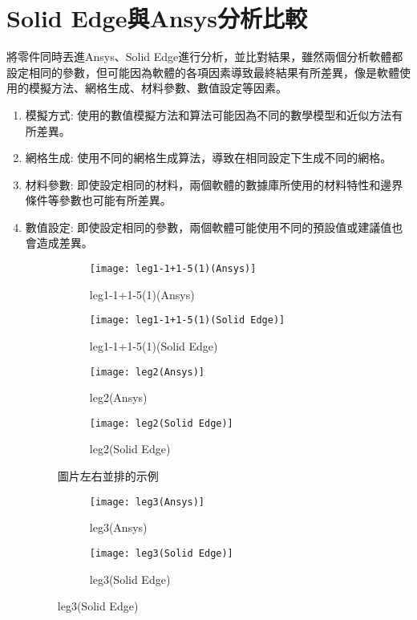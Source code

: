 \section{Solid Edge與Ansys分析比較}
將零件同時丟進Ansys、Solid Edge進行分析，並比對結果，雖然兩個分析軟體都設定相同的參數，但可能因為軟體的各項因素導致最終結果有所差異，像是軟體使用的模擬方法、網格生成、材料參數、數值設定等因素。\
\begin{enumerate}
\item 模擬方式: 使用的數值模擬方法和算法可能因為不同的數學模型和近似方法有所差異。
\item 網格生成: 使用不同的網格生成算法，導致在相同設定下生成不同的網格。
\item 材料參數: 即使設定相同的材料，兩個軟體的數據庫所使用的材料特性和邊界條件等參數也可能有所差異。
\item	數值設定: 即使設定相同的參數，兩個軟體可能使用不同的預設值或建議值也會造成差異。
\newpage
\begin{figure}[htbp]
  \centering
  \begin{subfigure}[t]{0.48\textwidth}
    \centering
    \texttt{[image: leg1-1+1-5(1)(Ansys)]}
    \caption{leg1-1+1-5(1)(Ansys)}
    \label{leg1-1+1-5(1)(Ansys)}
  \end{subfigure}
  \hfill
  \begin{subfigure}[t]{0.48\textwidth}
    \centering
    \texttt{[image: leg1-1+1-5(1)(Solid Edge)]}
    \caption{leg1-1+1-5(1)(Solid Edge)}
    \label{leg1-1+1-5(1)(Solid Edge)}
  \end{subfigure}

  \vspace{0.5cm} %

  \begin{subfigure}[t]{0.48\textwidth}
    \centering
    \texttt{[image: leg2(Ansys)]}
    \caption{leg2(Ansys)}
    \label{leg2(Ansys)}
  \end{subfigure}
  \hfill
  \begin{subfigure}[t]{0.48\textwidth}
    \centering
    \texttt{[image: leg2(Solid Edge)]}
    \caption{leg2(Solid Edge)}
    \label{leg2(Solid Edge)}
  \end{subfigure}

  \caption{圖片左右並排的示例}
  \label{fig:combined}
\end{figure}
\newpage


\begin{figure}[htbp]
  \centering
  \begin{subfigure}[t]{0.48\textwidth}
    \centering
    \texttt{[image: leg3(Ansys)]}
    \caption{leg3(Ansys)}
    \label{leg3(Ansys)}
  \end{subfigure}
  \hfill
  \begin{subfigure}[t]{0.48\textwidth}
    \centering
    \texttt{[image: leg3(Solid Edge)]}
    \caption{leg3(Solid Edge)}
    \label{leg3(Solid Edge)}
  \end{subfigure}


\end{figure}
\end{enumerate}
